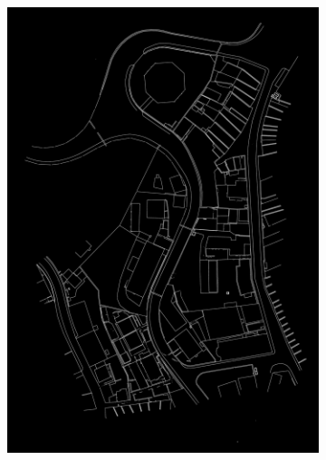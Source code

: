 \documentclass[12pt]{article}
\begin{document}
\begin{figure}[H]
\begin{subfigure}[b]{.4\textwidth}
		\includegraphics[width=1\linewidth]{images/additional_prediction.png}  
		\label{fig:original-pre}
	\end{subfigure}
	


\end{figure}
\end{document}
